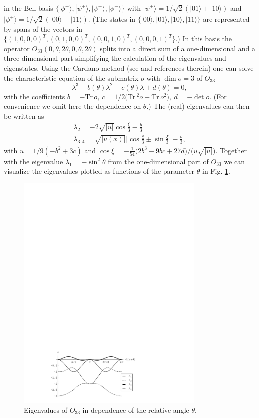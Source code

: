 \documentclass[prl,showpacs,showkeys,amsfonts,amsmath,twocolumn]{revtex4}
\newcommand{\ket}[1]{|#1\rangle}
\newcommand{\Tr}{\text{Tr}\,}
\begin{document}
in the Bell-basis
$\{\ket{\phi^+},\ket{\psi^+},\ket{\psi^-},\ket{\phi^-}\}$ with
$\ket{\psi^\pm} = 1/\sqrt{2}(\ket{01} \pm \ket{10})$ and
$\ket{\phi^\pm} = 1/\sqrt{2}(\ket{00} \pm \ket{11})$.
(The states in
$\{\ket{00},\ket{01},\ket{10},\ket{11}\}$ are represented by spans of the vectors in
$\{(1,0,0,0)^T,(0,1,0,0)^T,(0,0,1,0)^T,(0,0,0,1)^T\}$.)
In this basis 
the operator $O_{33}(0,\theta,2\theta,0,\theta,2\theta)$ splits into a direct sum of a one-dimensional
and a three-dimensional part simplifying the calculation of the
eigenvalues and eigenstates. Using the Cardano method 
(see \cite{cocolicchio00} and references therein) one can
solve the characteristic equation of the submatrix $o$ with $\dim o
=3$ of $O_{33}$
\begin{equation}
  \lambda^3 + b(\theta) \lambda^2 + c(\theta) \lambda + d(\theta) = 0,
\label{2004-qbounds-characteristic}
\end{equation}
with the coefficients $b = -\Tr o,\ c = 1/2\Big(\Tr^2 o -
\Tr o^2 \Big),\ d = -\det o$. (For convenience we omit here the
dependence on $\theta$.) The (real) eigenvalues can then be written as \cite{cocolicchio00}
\begin{eqnarray}
\lambda_2 = -2 \sqrt{|u|}\cos\frac{\xi}{3}-\frac{b}{3}\nonumber\\
\lambda_{3,4} = \sqrt{|u(x)|}\Big[\cos\frac{\xi}{3} \pm
\sin\frac{\xi}{3}\Big]-\frac{b}{3},
\label{2004-qbounds-o33ev}
\end{eqnarray}
with $u=1/9(-b^2+3 c)$ and $\cos\xi = - \frac{1}{54}\big(2
b^3-9 b c + 27 d\big)/\big(u\sqrt{|u|}\big)$.
Together with the eigenvalue $\lambda_1 = -\sin^2\theta$ from the
one-dimensional part of $O_{33}$ we can visualize the eigenvalues plotted as functions of
the parameter $\theta$ in Fig. \ref{fig:2004-qbounds-f1}.
\begin{figure}[htbp]
  \centering
  \includegraphics[width=90mm]{2004-qbounds-f1}
  \caption{Eigenvalues of $O_{33}$ in dependence of the relative angle $\theta$.}
  \label{fig:2004-qbounds-f1}
\end{figure}
\end{document}
